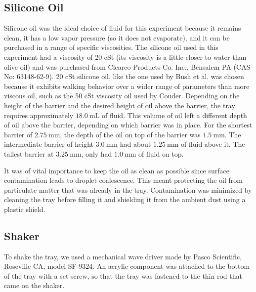 \subsection{Silicone Oil}
    Silicone oil was the ideal choice of fluid for this experiment because it remains clean, it has a low vapor pressure (so it does not evaporate), and it can be purchased in a range of specific viscosities. The silicone oil used in this experiment had a viscosity of 20 cSt (its viscosity is a little closer to water than olive oil) and was purchased from Clearco Products Co. Inc., Bensalem PA (CAS No: 63148-62-9). 20 cSt silicone oil, like the one used by Bush et al. was chosen because it exhibits walking behavior over a wider range of parameters than more viscous oil, such as the 50 cSt viscosity oil used by Couder. Depending on the height of the barrier and the desired height of oil above the barrier, the tray requires approximately $18.0~\mathrm{mL}$ of fluid. This volume of oil left a different depth of oil above the barrier, depending on which barrier was in place. For the shortest barrier of $2.75~\mathrm{mm}$, the depth of the oil on top of the barrier was $1.5~\mathrm{mm}$. The intermediate barrier of height $3.0~\mathrm{mm}$ had about $1.25~\mathrm{mm}$ of fluid above it. The tallest barrier at $3.25~\mathrm{mm}$, only had $1.0~\mathrm{mm}$ of fluid on top.
    
    It was of vital importance to keep the oil as clean as possible since surface contamination leads to droplet coalescence. This meant protecting the oil from particulate matter that was already in the tray. Contamination was minimized by cleaning the tray before filling it and shielding it from the ambient dust using a plastic shield.
    
\subsection{Shaker}
    To shake the tray, we used a mechanical wave driver made by Pasco Scientific, Roseville CA, model SF-9324. An acrylic component was attached to the bottom of the tray with a set screw, so that the tray was fastened to the thin rod that came on the shaker.
    
